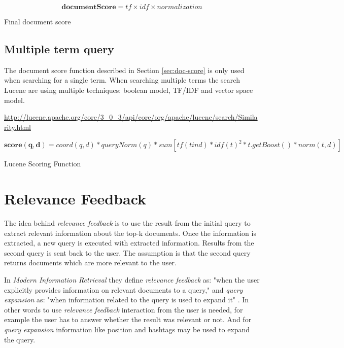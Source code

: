 \begin{cequation}[H]
	\begin{equation}
		\mathbf{documentScore} = tf \times idf \times normalization
	\end{equation}
	\caption{Final document score}
  \label{eq:document-score}
\end{cequation}

\subsection{Multiple term query}
The document score function described in Section \ref{sec:doc-score} is only used when searching for a single term.
When searching multiple terms the search Lucene are using multiple techniques: boolean model, TF/IDF and vector space model.

\url{http://lucene.apache.org/core/3_0_3/api/core/org/apache/lucene/search/Similarity.html}
\begin{cequation}[H]
	\begin{equation}
		\mathbf{score(q,d)} = coord(q,d) * queryNorm(q) * sum [tf(t in d) * idf(t)^2 * t.getBoost() * norm(t,d)]
	\end{equation}
	\caption{Lucene Scoring Function}
  \label{eq:scoring-function}
\end{cequation}

\section{Relevance Feedback}
The idea behind \textit{relevance feedback} is to use the result from the initial query to extract relevant information about the top-k documents.
Once the information is extracted, a new query is executed with extracted information.
Results from the second query is sent back to the user.
The assumption is that the second query returns documents which are more relevant to the user.

In \textit{Modern Information Retrieval} they define \textit{relevance feedback} as: "when the user explicitly provides information on relevant documents to a query,"
and \textit{query expansion} as: "when information related to the query is used to expand it" \cite[p. 177]{ir-book}.
In other words to use \textit{relevance feedback} interaction from the user is needed, for example the user has to answer whether the result was relevant or not.
And for \textit{query expansion} information like position and hashtags may be used to expand the query.

